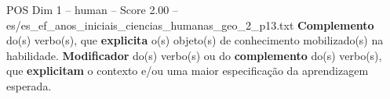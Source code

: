 \begin{textsample}{POS Dim 1 – human – Score 2.00 – es/es\_ef\_anos\_iniciais\_ciencias\_humanas\_geo\_2\_p13.txt}  \label{ex:f1_pos_001}
\textbf{Complemento} do(s) verbo(s), que \textbf{explicita} o(s) objeto(s) de conhecimento mobilizado(s) na habilidade. \textbf{Modificador} do(s) verbo(s) ou do \textbf{complemento} do(s) verbo(s), que \textbf{explicitam} o contexto e/ou uma maior especificação da aprendizagem esperada.

\end{textsample}
